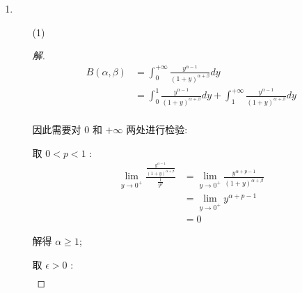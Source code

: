 \documentclass{article}
\begin{document}
\begin{enumerate}
\begin{enumerate}
\begin{proof}
\begin{equation}
\begin{aligned}
                    &=\int_{0}^{+\infty}s^{2x-2}\exp(-s^2)d(s^2) \\
                    &=\int_{0}^{+\infty}s^{2x-2}\exp(-s^2)2sds \\
                    &=2\int_{0}^{+\infty}s^{2x-1}\exp(-s^2)ds \\
                \end{aligned}
                \nonumber
            \end{equation} \par
            得证.
        \end{proof}
    \end{enumerate}
    \item \begin{enumerate}
        \item[(1)] \begin{proof}[解]
            \begin{equation}
                \begin{aligned}
                    B(\alpha,\beta)
                    &=\int_{0}^{+\infty}\frac{y^{\alpha-1}}{(1+y)^{\alpha+\beta}}dy \\
                    &=\int_{0}^{1}\frac{y^{\alpha-1}}{(1+y)^{\alpha+\beta}}dy+\int_{1}^{+\infty}\frac{y^{\alpha-1}}{(1+y)^{\alpha+\beta}}dy \\
                \end{aligned}
                \nonumber
            \end{equation} \par
            因此需要对 $0$ 和 $+\infty$ 两处进行检验: \par
            取 $0<p<1$ :
            \begin{equation}
                \begin{aligned}
                    \lim_{y\rightarrow0^+}\frac{\frac{y^{\alpha-1}}{(1+y)^{\alpha+\beta}}}{\frac{1}{y^p}}
                    &=\lim_{y\rightarrow0^+}\frac{y^{\alpha+p-1}}{(1+y)^{\alpha+\beta}} \\
                    &=\lim_{y\rightarrow0^+}y^{\alpha+p-1} \\
                    &=0
                \end{aligned}
                \nonumber
            \end{equation} \par
            解得 $\alpha\geq1$; \par
            取 $\epsilon>0$ :
            \begin{equation}
                \begin{aligned}

\end{aligned}
\end{equation}
\end{proof}
\end{enumerate}
\end{enumerate}
\end{document}
